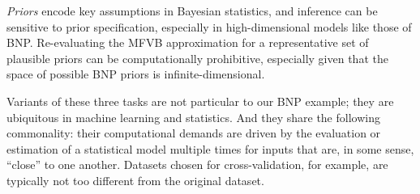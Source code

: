 {\em Priors} encode key assumptions in Bayesian statistics, and inference can
be sensitive to prior specification, especially in high-dimensional models
like those of BNP.
Re-evaluating the MFVB approximation for a representative set of
plausible priors can be computationally prohibitive, especially given that the
space of possible BNP priors is infinite-dimensional.

%

Variants of these three tasks are not particular to our BNP example; they are
ubiquitous in machine learning and statistics.  And they share the following
commonality: their computational demands are driven by the evaluation or
estimation of a statistical model multiple times for inputs that are, in some
sense, ``close'' to one another. Datasets chosen for cross-validation, for
example, are typically not too different from the original dataset.

